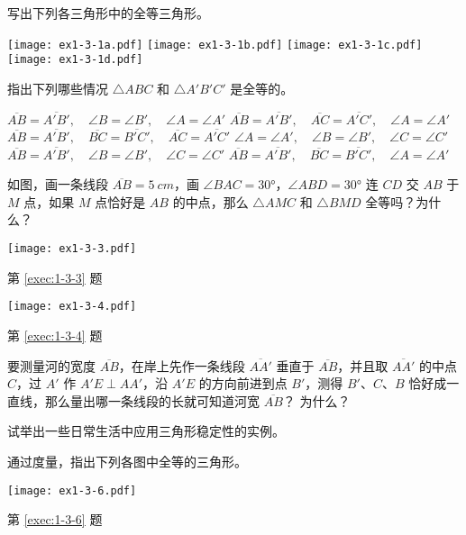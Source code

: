 \begin{Exercise}
\begin{question}
	\item\label{exec:1-3-1} 写出下列各三角形中的全等三角形。
	\begin{figurehere}
		\texttt{[image: ex1-3-1a.pdf]}
		\texttt{[image: ex1-3-1b.pdf]}
		\texttt{[image: ex1-3-1c.pdf]}
		\texttt{[image: ex1-3-1d.pdf]}
	\end{figurehere}
	\item 指出下列哪些情况 $\triangle ABC$ 和 $\triangle A'B'C'$ 是全等的。
	\begin{tasks}
		\task $\overline{AB}=\overline{A'B'},\quad \angle B=\angle B',\quad \angle A=\angle A'$
		\task $\overline{AB}=\overline{A'B'},\quad \overline{AC}=\overline{A'C'}, \quad \angle A=\angle A'$
		\task $\overline{AB}=\overline{A'B'},\quad \overline{BC}=\overline{B'C'},\quad \overline{AC}=\overline{A'C'}$
		\task $\angle A=\angle A',\quad \angle B=\angle B',\quad \angle C=\angle C'$
		\task $\overline{AB}=\overline{A'B'},\quad  \angle B=\angle B',\quad \angle C=\angle C'$
		\task $\overline{AB}=\overline{A'B'},\quad \overline{BC}=\overline{B'C'},\quad \angle A=\angle A'$
	\end{tasks}
	\item\label{exec:1-3-3} 如图，画一条线段 $\overline{AB}=\qty{5}{cm}$，画 $\angle BAC=\ang{30}$，$\angle ABD=\ang{30}$ 连 $CD$ 交 $AB$ 于 $M$ 点，如果 $M$ 点恰好是 $AB$ 的中点，那么 $\triangle AMC$ 和 $\triangle BMD$ 全等吗？为什么？
	\begin{figurehere}
		\begin{minipage}[b]{0.48\linewidth}
			\centering
			\texttt{[image: ex1-3-3.pdf]}
			\caption*{第 \ref{exec:1-3-3} 题}
		\end{minipage}
		\begin{minipage}[b]{0.48\linewidth}
			\centering
			\texttt{[image: ex1-3-4.pdf]}
			\caption*{第 \ref{exec:1-3-4} 题}
		\end{minipage}
	\end{figurehere}
	\item\label{exec:1-3-4} 要测量河的宽度 $\overline{AB}$，在岸上先作一条线段 $\overline{AA'}$ 垂直于 $\overline{AB}$，并且取 $\overline{AA'}$ 的中点 $C$，过 $A'$ 作 $A'E\perp AA'$，沿 $A'E$ 的方向前进到点 $B'$，测得 $B'$、$C$、$B$ 恰好成一直线，那么量出哪一条线段的长就可知道河宽 $\overline{AB}$？ 为什么？
	\item 试举出一些日常生活中应用三角形稳定性的实例。
	\item\label{exec:1-3-6} 通过度量，指出下列各图中全等的三角形。
	\begin{figurehere}
		\begin{minipage}{\linewidth}\centering
			\texttt{[image: ex1-3-6.pdf]}
			\caption*{第 \ref{exec:1-3-6} 题}
		\end{minipage}
	\end{figurehere}
\end{question}
\end{Exercise}

